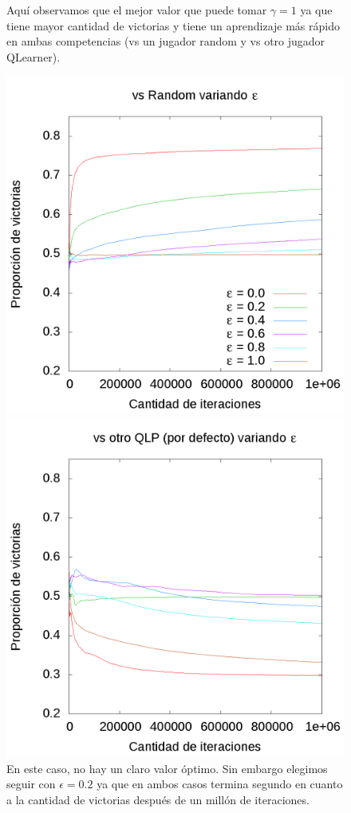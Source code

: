 \documentclass[10pt, a4paper]{article}
\begin{document}
\begin{figure}[ht]
\begin{minipage}[c]{1\textwidth}
	Aquí observamos que el mejor valor que puede tomar $\gamma = 1$ ya que tiene mayor cantidad de victorias y tiene un aprendizaje más rápido en ambas competencias (vs un jugador random y vs otro jugador QLearner). 
  \end{minipage}
\end{figure}
\begin{figure}[ht]
  \begin{minipage}[c]{1\textwidth}
	\includegraphics[scale=0.32]{EpsilonR.png}
	\includegraphics[scale=0.32]{EpsilonQ.png}
	En este caso, no  hay un claro valor óptimo. Sin embargo elegimos seguir con $\epsilon=0.2$ ya que en ambos casos termina segundo en cuanto a la cantidad de victorias después de un millón de iteraciones.
  \end{minipage}
\end{figure}
\end{document}
